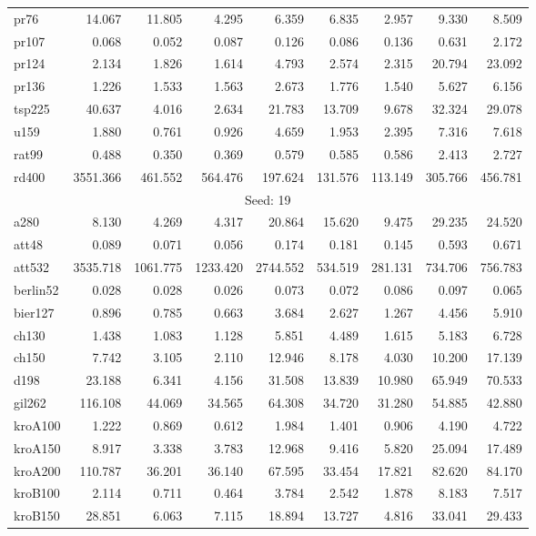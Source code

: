 \begin{center}
\begin{longtable}{lrrrrrrrr}
pr76 & 14.067 & 11.805 & 4.295 & 6.359 & 6.835 & 2.957 & 9.330 & 8.509\\
pr107 & 0.068 & 0.052 & 0.087 & 0.126 & 0.086 & 0.136 & 0.631 & 2.172\\
pr124 & 2.134 & 1.826 & 1.614 & 4.793 & 2.574 & 2.315 & 20.794 & 23.092\\
pr136 & 1.226 & 1.533 & 1.563 & 2.673 & 1.776 & 1.540 & 5.627 & 6.156\\
tsp225 & 40.637 & 4.016 & 2.634 & 21.783 & 13.709 & 9.678 & 32.324 & 29.078\\
u159  & 1.880 & 0.761 & 0.926 & 4.659 & 1.953 & 2.395 & 7.316 & 7.618\\
rat99 & 0.488 & 0.350 & 0.369 & 0.579 & 0.585 & 0.586 & 2.413 & 2.727\\
rd400 & 3551.366 & 461.552 & 564.476 & 197.624 & 131.576 & 113.149 & 305.766 & 456.781\\
\hline \multicolumn{9}{c}{{Seed: 19}} \\ \hline
a280 & 8.130 & 4.269 & 4.317 & 20.864 & 15.620 & 9.475 & 29.235 & 24.520\\
att48  & 0.089 & 0.071 & 0.056 & 0.174 & 0.181 & 0.145 & 0.593 & 0.671\\
att532  & 3535.718 & 1061.775 & 1233.420 & 2744.552 & 534.519 & 281.131 & 734.706 & 756.783\\
berlin52  & 0.028 & 0.028 & 0.026 & 0.073 & 0.072 & 0.086 & 0.097 & 0.065\\
bier127  & 0.896 & 0.785 & 0.663 & 3.684 & 2.627 & 1.267 & 4.456 & 5.910\\
ch130  & 1.438 & 1.083 & 1.128 & 5.851 & 4.489 & 1.615 & 5.183 & 6.728\\
ch150   & 7.742 & 3.105 & 2.110 & 12.946 & 8.178 & 4.030 & 10.200 & 17.139\\
d198  & 23.188 & 6.341 & 4.156 & 31.508 & 13.839 & 10.980 & 65.949 & 70.533\\
gil262  & 116.108 & 44.069 & 34.565 & 64.308 & 34.720 & 31.280 & 54.885 & 42.880\\
kroA100  & 1.222 & 0.869 & 0.612 & 1.984 & 1.401 & 0.906 & 4.190 & 4.722\\
kroA150  & 8.917 & 3.338 & 3.783 & 12.968 & 9.416 & 5.820 & 25.094 & 17.489\\
kroA200  & 110.787 & 36.201 & 36.140 & 67.595 & 33.454 & 17.821 & 82.620 & 84.170\\
kroB100  & 2.114 & 0.711 & 0.464 & 3.784 & 2.542 & 1.878 & 8.183 & 7.517\\
kroB150 & 28.851 & 6.063 & 7.115 & 18.894 & 13.727 & 4.816 & 33.041 & 29.433\\

\end{longtable}
\end{center}
